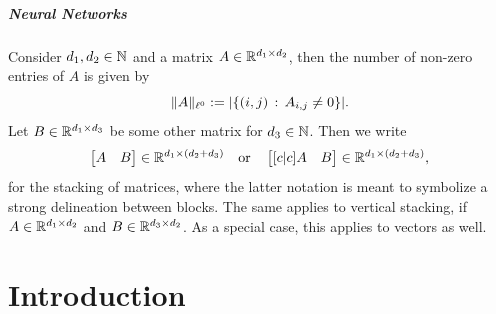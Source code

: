 \paragraph{Neural Networks}

Consider $d_1, d_2 \in \mathbb{N}$ and a matrix $A \in \mathbb{R}^{d_1 \times d_2}$, then the number of non-zero entries of $A$
is given by
\begin{equation*}
    \lVert A \rVert_{\ell^0}:= \vert \{(i,j) \, : \, A_{i,j} \neq 0 \} \vert.
\end{equation*}
Let $B \in \mathbb{R}^{d_1 \times d_3}$ be some other matrix for $d_3 \in \mathbb{N}$. Then we write
\begin{equation*}
    \begin{bmatrix}
        A & B
    \end{bmatrix} \in \mathbb{R}^{d_1 \times (d_2 + d_3)}
    \quad \text{or} \quad
    \begin{bmatrix}[c|c]
        A & B
    \end{bmatrix} \in \mathbb{R}^{d_1 \times (d_2 + d_3)},
\end{equation*}
for the stacking of matrices, where the latter notation is meant to symbolize a strong delineation between
blocks. The same applies to vertical stacking, if $A \in \mathbb{R}^{d_1 \times d_2}$ and $B \in \mathbb{R}^{d_3 \times d_2}$.
As a special case, this applies to vectors as well. 






\chapter{Introduction}





